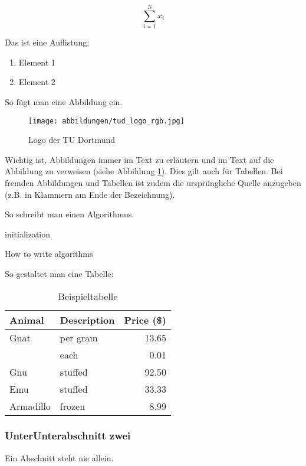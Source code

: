 \begin{equation}
    \sum_{i=1}^N x_i
    \label{eq:1}
\end{equation}

Das ist eine Auflistung:

\begin{enumerate}
\item Element 1
\item Element 2
\end{enumerate}

So fügt man eine Abbildung ein.

\begin{figure}[H]
    \centering
    \texttt{[image: abbildungen/tud\_logo\_rgb.jpg]}
    \caption{Logo der TU Dortmund}
    \label{fig:my_label}
\end{figure}

Wichtig ist, Abbildungen immer im Text zu erläutern und im Text auf die Abbildung zu verweisen (siehe Abbildung \ref{fig:my_label}). Dies gilt auch für Tabellen. Bei fremden Abbildungen und Tabellen ist zudem die ursprüngliche Quelle anzugeben (z.B. in Klammern am Ende der Bezeichnung).

So schreibt man einen Algorithmus.
\BlankLine
\begin{algorithm}[H]
 initialization\;
 \caption{How to write algorithms}
\end{algorithm}
\BlankLine
\BlankLine
So gestaltet man eine Tabelle:
\begin{table}[H]
\caption{Beispieltabelle}
\centering
\begin{tabular}{llr}
\hline
Animal    & Description & Price (\$) \\
\hline
Gnat      & per gram    & 13.65      \\
          & each        & 0.01       \\
Gnu       & stuffed     & 92.50      \\
Emu       & stuffed     & 33.33      \\
Armadillo & frozen      & 8.99       \\
\hline
\end{tabular}
\end{table}

\subsubsection{UnterUnterabschnitt zwei}

Ein Abschnitt steht nie allein.

